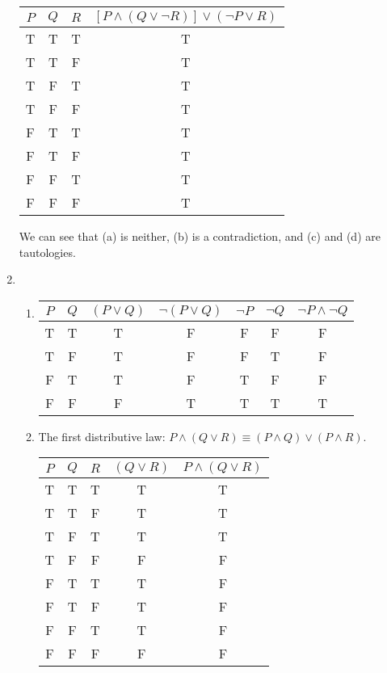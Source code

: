 \documentclass{article}
\begin{document}
\begin{enumerate}
  \begin {tabular}{c c c c}
    $P$ & $Q$ & $R$ & $[P \land (Q \lor \lnot R)] \lor (\lnot P \lor R)$ \\ \hline
    T & T & T & T \\
    T & T & F & T \\
    T & F & T & T \\
    T & F & F & T \\
    F & T & T & T \\
    F & T & F & T \\
    F & F & T & T \\
    F & F & F & T \\
  \end{tabular}

  We can see that (a) is neither, (b) is a contradiction, and (c) and (d) are tautologies.

\item
  \begin{enumerate}
  \item

    \begin{tabular}{c c c c c c c}
      $P$ & $Q$ & $(P \lor Q)$ & $\lnot (P \lor Q)$ & $\lnot P$ & $\lnot Q$ & $\lnot P \land \lnot Q$ \\ \hline
      T & T & T & F & F & F & F \\
      T & F & T & F & F & T & F \\
      F & T & T & F & T & F & F \\
      F & F & F & T & T & T & T \\
    \end{tabular}
  \item
    The first distributive law: $P \land (Q \lor R) \equiv (P \land Q) \lor (P \land R)$.

    \begin{tabular}{c c c c c}
      $P$ & $Q$ & $R$ & $(Q \lor R)$ & $P \land (Q \lor R)$ \\ \hline
      T & T & T & T & T \\
      T & T & F & T & T \\
      T & F & T & T & T \\
      T & F & F & F & F \\
      F & T & T & T & F \\
      F & T & F & T & F \\
      F & F & T & T & F \\
      F & F & F & F & F \\
    \end{tabular}


\end{enumerate}
\end{enumerate}
\end{document}
